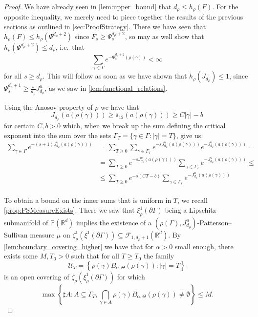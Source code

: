 \documentclass{report}
\begin{document}
\begin{proof}
    We have already seen in \cref{lem:upper_bound} that $d_\rho \leq h_\rho(F)$.
    For the opposite inequality, we merely need to piece together the results of the previous sections as outlined in \cref{sec:ProofStrategy}.
    There we have seen that $h_\rho(F) \leq h_\rho(\Psi^{d_\rho + 2})$ since $F_s \geq \Psi_s^{d_\rho + 2}$, so may as well show that $h_\rho(\Psi^{d_\rho + 2}) \leq d_\rho$, i.e.\ that
    \[
        \sum_{\gamma \in \Gamma} e^{-\Psi^{d_\rho + 2}_s(\rho(\gamma))} < \infty
    \]
    for all $s \geq d_\rho$.
    This will follow as soon as we have shown that $h_\rho(J_{d_\rho}) \leq 1$, since $\Psi_s^{d_\rho + 1} \geq \frac{s}{d_\rho} J_{d_\rho}^u$, as we saw in \cref{lem:functional_relations}.
    
    Using the Anosov property of $\rho$ we have that
    \[
    J_{d_\rho}(a(\rho(\gamma))) \geq \mathsf a_{12} (a(\rho(\gamma))) \geq C|\gamma| - b    
    \]
    for certain $C, b > 0$ which, when we break up the sum defining the critical exponent into the sum over the sets $\Gamma_T = \{ \gamma \in \Gamma: |\gamma| = T\}$, give us:
    \begin{align*}
        \sum_{\gamma \in \Gamma} e^{-(s+1)J_{d_\rho}^u(a(\rho(\gamma)))} &=
        \sum_{T \geq 0} \sum_{\gamma \in \Gamma_T} e^{-s J_{d_\rho}^u(a(\rho(\gamma)))}
        e^{-J_{d_\rho}^u(a(\rho(\gamma)))} =\\
        &=
        \sum_{T \geq 0} e^{-s J_{d_\rho}^u(a(\rho(\gamma)))} 
            \sum_{\gamma \in \Gamma_T} e^{-J_{d_\rho}^u(a(\rho(\gamma)))} \leq\\
        &\leq
        \sum_{T \geq 0} e^{-s (C T - b)} 
            \sum_{\gamma \in \Gamma_T} e^{-J_{d_\rho}^u(a(\rho(\gamma)))}\\
    \end{align*}
    
    To obtain a bound on the inner sums that is uniform in $T$, we recall \cref{prop:PSMeasureExists}. 
    There we saw that $\xi^1_\rho(\partial \Gamma)$ being a Lipschitz submanifold of $\mathbb P(\mathbb R^d)$ implies the existence of a $(\rho(\Gamma), J_{d_\rho}^u)$-Patterson--Sullivan measure $\mu$ on $\zeta^1_\rho(\xi^1(\partial \Gamma)) \subseteq \mathcal F_{1, d_\rho + 1}(\mathbb R^d)$.
    By \cref{lem:boundary_covering_higher} we have that for $\alpha > 0$ small enough, there exists some $M, T_0 > 0$ such that for all $T \geq T_0$ the family
    \[
        \mathcal U_T = \left\{ \rho(\gamma) B_{\alpha, \Theta}(\rho(\gamma)) : |\gamma| = T \right\}
    \]
    is an open covering of $\zeta_\rho(\xi^1_\rho(\partial \Gamma))$ for which
    \[
        \max
        \left\{\sharp A : A \subseteq \Gamma_T,  \bigcap_{\gamma \in A}\rho(\gamma)B_{\alpha, \Theta}(\rho(\gamma)) \neq \emptyset \right\} \leq M.
    \]


\end{proof}
\end{document}
